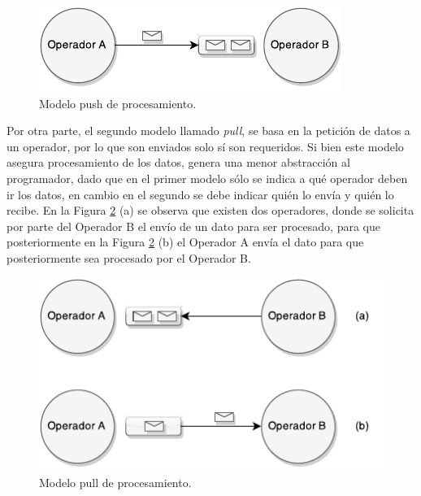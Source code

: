 \begin{figure}[ht!]
  \centering
    \includegraphics[scale=1]{images/SPS-Push.pdf}
  \caption{Modelo push de procesamiento.}
  \label{fig:sps-push}
\end{figure}

Por otra parte, el segundo modelo llamado \textit{pull}, se basa en la petición de datos a un operador, por lo que son enviados solo sí son requeridos. Si bien este modelo asegura procesamiento de los datos, genera una menor abstracción al programador, dado que en el primer modelo sólo se indica a \normalsize{qué} operador deben ir los datos, en cambio en el segundo se debe indicar quién lo envía y quién lo recibe. En la Figura \ref{fig:sps-pull} (a) se observa que existen dos operadores, donde se solicita por parte del Operador B el envío de un dato para ser procesado, para que posteriormente en la Figura \ref{fig:sps-pull} (b) el Operador A envía el dato para que posteriormente sea procesado por el Operador B.

\begin{figure}[ht!]
  \centering
    \includegraphics[scale=1]{images/SPS-Pull.pdf}
  \caption{Modelo pull de procesamiento.}
  \label{fig:sps-pull}
\end{figure}


